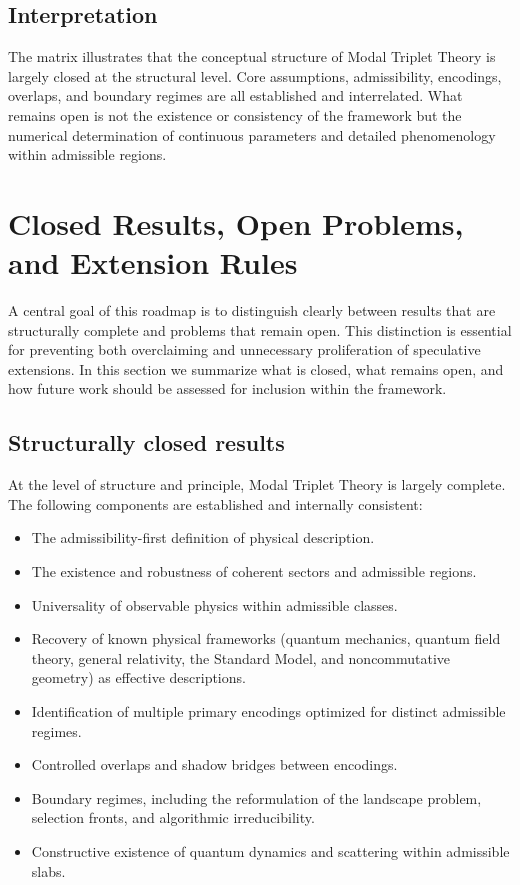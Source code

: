 \documentclass[11pt]{article}
\begin{document}
\subsection{Interpretation}

The matrix illustrates that the conceptual structure of Modal Triplet Theory is largely closed at the structural level. Core assumptions, admissibility, encodings, overlaps, and boundary regimes are all established and interrelated. What remains open is not the existence or consistency of the framework but the numerical determination of continuous parameters and detailed phenomenology within admissible regions.
\section{Closed Results, Open Problems, and Extension Rules}

A central goal of this roadmap is to distinguish clearly between results that are structurally complete and problems that remain open. This distinction is essential for preventing both overclaiming and unnecessary proliferation of speculative extensions. In this section we summarize what is closed, what remains open, and how future work should be assessed for inclusion within the framework.

\subsection{Structurally closed results}

At the level of structure and principle, Modal Triplet Theory is largely complete. The following components are established and internally consistent:

\begin{itemize}
\item The admissibility-first definition of physical description.
\item The existence and robustness of coherent sectors and admissible regions.
\item Universality of observable physics within admissible classes.
\item Recovery of known physical frameworks (quantum mechanics, quantum field theory, general relativity, the Standard Model, and noncommutative geometry) as effective descriptions.
\item Identification of multiple primary encodings optimized for distinct admissible regimes.
\item Controlled overlaps and shadow bridges between encodings.
\item Boundary regimes, including the reformulation of the landscape problem, selection fronts, and algorithmic irreducibility.
\item Constructive existence of quantum dynamics and scattering within admissible slabs.
\end{itemize}
\end{document}
